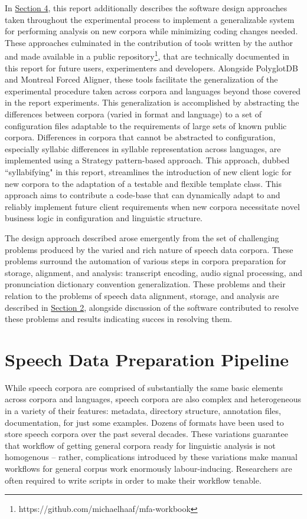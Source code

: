 \documentclass[11pt]{article}
\begin{document}
In \hyperlink{section.4}{Section 4}, this report additionally describes the software design approaches taken throughout the experimental process to implement a generalizable system for performing analysis on new corpora while minimizing coding changes needed. These approaches culminated in the contribution of tools written by the author and made available in a public repository\footnote{https://github.com/michaelhaaf/mfa-workbook}, that are technically documented in this report for future users, experimenters and developers. Alongside PolyglotDB and Montreal Forced Aligner, these tools facilitate the generalization of the experimental procedure taken across corpora and languages beyond those covered in the report experiments. This generalization is accomplished by abstracting the differences between corpora (varied in format and language) to a set of configuration files adaptable to the requirements of large sets of known public corpora. Differences in corpora that cannot be abstracted to configuration, especially syllabic differences in syllable representation across languages, are implemented using a Strategy pattern-based approach. This approach, dubbed ``syllabifying" in this report, streamlines the introduction of new client logic for new corpora to the adaptation of a testable and flexible template class. This approach aims to contribute a code-base that can dynamically adapt to and reliably implement future client requirements when new corpora necessitate novel business logic in configuration and linguistic structure.

The design approach described arose emergently from the set of challenging problems produced by the varied and rich nature of speech data corpora. These problems surround the automation of various steps in corpora preparation for storage, alignment, and analysis: transcript encoding, audio signal processing, and pronunciation dictionary convention generalization. These problems and their relation to the problems of speech data alignment, storage, and analysis are described in \hyperlink{section.2}{Section 2}, alongside discussion of the software contributed to resolve these problems and results indicating succes in resolving them.

\section{Speech Data Preparation Pipeline}

While speech corpora are comprised of substantially the same basic elements across corpora and languages, speech corpora are also complex and heterogeneous in a variety of their features: metadata, directory structure, annotation files, documentation, for just some examples. Dozens of formats have been used to store speech corpora over the past several decades. These variations guarantee that workflow of getting general corpora ready for linguistic analysis is not homogenous -- rather, complications introduced by these variations make manual workflows for general corpus work enormously labour-inducing. Researchers are often required to write scripts in order to make their workflow tenable.
\end{document}
